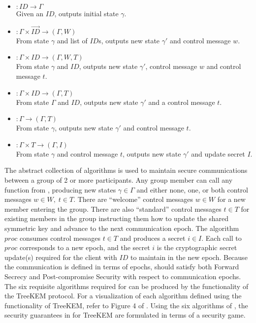 \begin{itemize}
\item {}   \(: ID \to \Gamma\)\\
  Given an \(ID\), outputs initial state \(\gamma\).
\item {} \(: \Gamma \times \overrightarrow{ID} \to (\Gamma, W)\)\\
  From state \(\gamma\) and list of \(ID\)s, outputs new state \(\gamma'\) and control message \(w\).
\item {}    \(: \Gamma \times ID \to (\Gamma, W, T)\)\\
  From state \(\gamma\) and \(ID\), outputs new state \(\gamma'\), control message \(w\) and control message \(t\).
\item {}    \(: \Gamma \times ID \to (\Gamma, T)\)\\
  From state \(\Gamma\) and \(ID\), outputs new state \(\gamma'\) and a control message \(t\).
\item {}    \(: \Gamma \to (\Gamma, T)\)\\
  From state \(\gamma\), outputs new state \(\gamma'\) and control message \(t\).
\item {}   \(: \Gamma \times T \to (\Gamma, I)\)\\
  From state \(\gamma\) and control message \(t\), outputs new state \(\gamma'\) and update secret \(I\).
\end{itemize}

The abstract collection of algorithms \CGKAdef is used to maintain secure communications between a group of 2 or more participants.
Any group member can call any function from \CGKAdef, producing new states \(\gamma \in \Gamma\) and either none, one, or both control messages \(w \in W,\; t \in T\).
There are ``welcome'' control messages \(w \in W\) for a new member entering the group.
There are also ``standard'' control messages \(t \in T\) for existing members in the group instructing them how to update the shared symmetric key and advance to the next communication epoch.
The algorithm \(proc\) consumes control messages \(t \in T\) and produces a secret \(i \in I\).
Each call to \(proc\) corresponds to a new epoch, and the secret \(i\) is the cryptographic secret update(s) required for the client with \(ID\) to maintain  in the new epoch.
Because the communication is defined in terms of epochs,  should satisfy both Forward Secrecy and Post-compromise Security with respect to communication epochs.
The six requisite algorithms required for \CGKAdef can be produced by the functionality of the TreeKEM protocol.
For a visualization of each \CGKAdef algorithm defined using the functionality of TreeKEM, refer to Figure 4 of \autocite{alwen2020security}.
Using the six algorithms of \CGKAdef, the security guarantees in for TreeKEM are formulated in terms of a security game.


